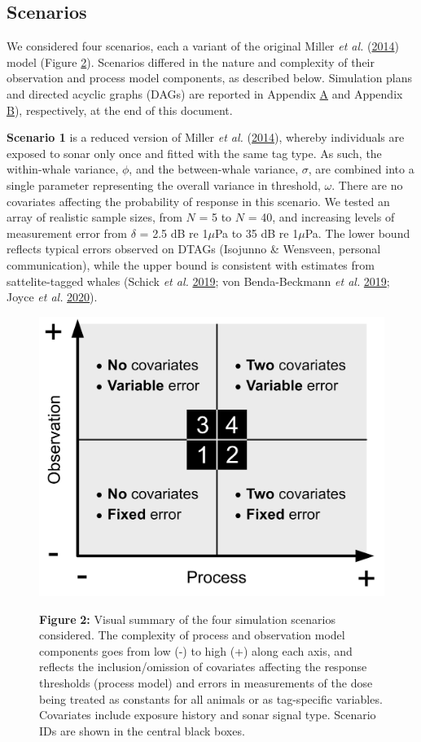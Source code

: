 \documentclass[
]{article}
\begin{document}
\subsection{Scenarios}

We considered four scenarios, each a variant of the original Miller \emph{et al.} (\protect\hyperlink{ref-Miller2014}{2014}) model (Figure \hyperlink{fig2}{2}). Scenarios differed in the nature and complexity of their observation and process model components, as described below. Simulation plans and directed acyclic graphs (DAGs) are reported in Appendix \hyperlink{appendixa}{A} and Appendix \hyperlink{appendixb}{B}), respectively, at the end of this document.

\textbf{Scenario 1} is a reduced version of Miller \emph{et al.} (\protect\hyperlink{ref-Miller2014}{2014}), whereby individuals are exposed to sonar only once and fitted with the same tag type. As such, the within-whale variance, \(\phi\), and the between-whale variance, \(\sigma\), are combined into a single parameter representing the overall variance in threshold, \(\omega\). There are no covariates affecting the probability of response in this scenario. We tested an array of realistic sample sizes, from \(N\) = 5 to \(N\) = 40, and increasing levels of measurement error from \(\delta\) = 2.5 dB re 1\(\mu\)Pa to 35 dB re 1\(\mu\)Pa. The lower bound reflects typical errors observed on DTAGs (Isojunno \& Wensveen, personal communication), while the upper bound is consistent with estimates from sattelite-tagged whales (Schick \emph{et al.} \protect\hyperlink{ref-Schick2019}{2019}; von Benda-Beckmann \emph{et al.} \protect\hyperlink{ref-vonBendaBeckmann2019}{2019}; Joyce \emph{et al.} \protect\hyperlink{ref-Joyce2020}{2020}).



\begin{figure}

{\centering \includegraphics[width=0.5\linewidth]{fig/fig_scomplexity} 

}

\textbf{Figure }{\textbf{2:} \hypertarget{fig2}{}Visual summary of the four simulation scenarios considered. The complexity of process and observation model components goes from low (-) to high (+) along each axis, and reflects the inclusion/omission of covariates affecting the response thresholds (process model) and errors in measurements of the dose being treated as constants for all animals or as tag-specific variables. Covariates include exposure history and sonar signal type. Scenario IDs are shown in the central black boxes.}\label{fig:fig2}
\end{figure}
\end{document}
